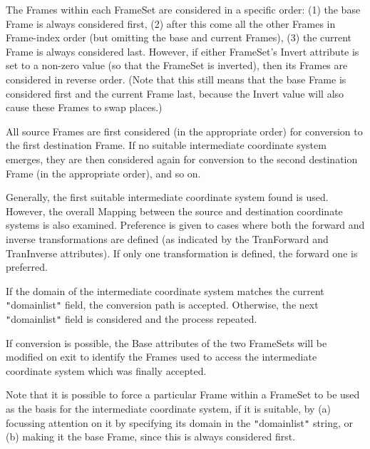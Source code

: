 \documentclass[twoside,11pt]{article}
\newcommand{\htmlref}[2]{#1}
\begin{document}
{{{         \sstitem
            The Frames within each FrameSet are considered in a
            specific order: (1) the base Frame is always considered
            first, (2) after this come all the other Frames in
            Frame-index order (but omitting the base and current Frames),
            (3) the current Frame is always considered last.  However, if
            either FrameSet's \htmlref{Invert}{Invert} attribute is set to a non-zero value
            (so that the FrameSet is inverted), then its Frames are
            considered in reverse order. (Note that this still means that
            the base Frame is considered first and the current Frame
            last, because the Invert value will also cause these Frames
            to swap places.)

         \sstitem
            All source Frames are first considered (in the appropriate
            order) for conversion to the first destination Frame. If no
            suitable intermediate coordinate system emerges, they are
            then considered again for conversion to the second
            destination Frame (in the appropriate order), and so on.

         \sstitem
            Generally, the first suitable intermediate coordinate
            system found is used. However, the overall Mapping between
            the source and destination coordinate systems is also
            examined.  Preference is given to cases where both the
            forward and inverse transformations are defined (as indicated
            by the \htmlref{TranForward}{TranForward} and \htmlref{TranInverse}{TranInverse} attributes). If only one
            transformation is defined, the forward one is preferred.

         \sstitem
            If the domain of the intermediate coordinate system matches
            the current {\tt{"}}domainlist{\tt{"}} field, the conversion path is
            accepted. Otherwise, the next {\tt{"}}domainlist{\tt{"}} field is considered
            and the process repeated.

      }
         If conversion is possible, the Base attributes of the two
         FrameSets will be modified on exit to identify the Frames
         used to access the intermediate coordinate system which was
         finally accepted.

         Note that it is possible to force a particular Frame within a
         FrameSet to be used as the basis for the intermediate
         coordinate system, if it is suitable, by (a) focussing
         attention on
         it by specifying its domain in the {\tt{"}}domainlist{\tt{"}} string, or (b)
         making it the base Frame, since this is always considered
         first.
   }
}
\end{document}
